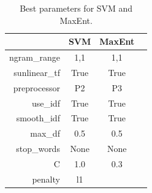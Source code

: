 \begin{table}[htb]
\centering
\begin{tabular}{|r||c|c|c|} 
\cline{2-3}
\multicolumn{1}{c|}{ } & \textbf{SVM} & \textbf{MaxEnt} \\ \hline
ngram\_range & 1,1 & 1,1 \\ \hline
sunlinear\_tf  & True & True \\ \hline
preprocessor & P2 & P3 \\ \hline
use\_idf & True & True \\ \hline
smooth\_idf & True & True \\ \hline
max\_df & 0.5 & 0.5 \\ \hline
stop\_words & None & None \\ \hline
C & 1.0 & 0.3 \\ \hline
penalty & l1 & \\ \hline

\end{tabular}
\caption{Best parameters for SVM and MaxEnt.}
\label{tab:svm_maxent_best_params}
\end{table}



